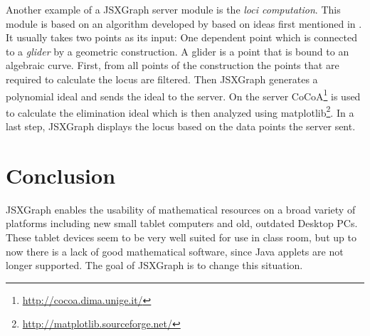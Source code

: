 \documentclass[12pt,a4paper]{article}%
\begin{document}
Another example of a JSXGraph server module is the \emph{loci computation}. This module is based on an algorithm
developed by \cite{botana} based on ideas first mentioned in \cite{recio}. It usually takes two points as its input: One
dependent point which is connected to a \emph{glider} by a geometric construction. A glider is a point that is bound to
an algebraic curve. First, from all points of the construction the points that are required to calculate the locus are
filtered. Then JSXGraph generates a polynomial ideal and sends the ideal to the server. On the server
CoCoA\footnote{\href{http://cocoa.dima.unige.it/}{http://cocoa.dima.unige.it/}} is used to calculate the elimination ideal
which is then analyzed using matplotlib\footnote{\href{http://matplotlib.sourceforge.net/}{http://matplotlib.sourceforge.net/}}.
In a last step, JSXGraph displays the locus based on the data points the server sent.

\section{Conclusion}
JSXGraph enables the usability of mathematical resources on a broad variety of 
platforms including new small tablet computers and old, outdated Desktop PCs. 
These tablet devices seem to be very well suited for use in class room, 
but up to now there is a lack of good mathematical software, since Java applets are not longer supported. 
The goal of JSXGraph is to change this situation. 
\end{document}
